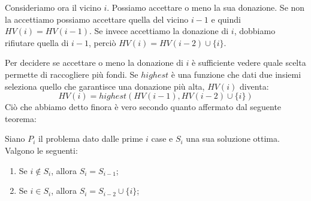 Consideriamo ora il vicino $i$. Possiamo accettare o meno la sua donazione.
Se non la accettiamo possiamo accettare quella del vicino $i-1$ e quindi
$HV(i)=HV(i-1)$. Se invece accettiamo la donazione di $i$, dobbiamo rifiutare
quella di $i-1$, perciò $HV(i)=HV(i-2)\cup\{i\}$.

\noindent
Per decidere se accettare o meno la donazione di $i$ è sufficiente vedere
quale scelta permette di raccogliere più fondi. Se $highest$ è una
funzione che dati due insiemi seleziona quello che garantisce una donazione
più alta, $HV(i)$ diventa:
\[HV(i)=highest\left(HV(i-1),HV(i-2)\cup\{i\}\right)\]
Ciò che abbiamo detto finora è vero secondo quanto affermato dal seguente teorema:
\begin{definition}
    Siano $P_i$ il problema dato dalle prime $i$ case e $S_i$ una sua soluzione
    ottima. Valgono le seguenti:
    \begin{enumerate}
        \item Se $i\notin S_i$, allora $S_i=S_{i-1}$;
        \item Se $i\in S_i$, allora $S_i=S_{i-2}\cup\{i\}$;
    \end{enumerate}
\end{definition}

